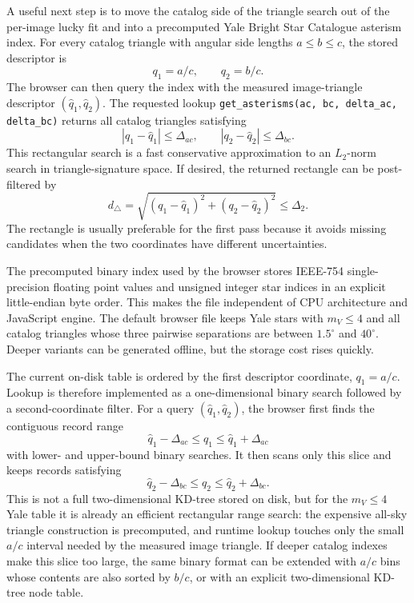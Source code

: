 \documentclass[11pt]{article}
\begin{document}
A useful next step is to move the catalog side of the triangle search out of
the per-image lucky fit and into a precomputed Yale Bright Star Catalogue
asterism index. For every catalog triangle with angular side lengths
\(a\le b\le c\), the stored descriptor is
\begin{equation}
  q_1 = a/c,\qquad q_2 = b/c .
\end{equation}
The browser can then query the index with the measured image-triangle
descriptor \((\hat q_1,\hat q_2)\). The requested lookup
\texttt{get\_asterisms(ac, bc, delta\_ac, delta\_bc)} returns all catalog
triangles satisfying
\begin{equation}
  |q_1-\hat q_1| \le \Delta_{ac}, \qquad
  |q_2-\hat q_2| \le \Delta_{bc}.
\end{equation}
This rectangular search is a fast conservative approximation to an
\(L_2\)-norm search in triangle-signature space. If desired, the returned
rectangle can be post-filtered by
\begin{equation}
  d_\triangle =
  \sqrt{(q_1-\hat q_1)^2 + (q_2-\hat q_2)^2}
  \le \Delta_2 .
\end{equation}
The rectangle is usually preferable for the first pass because it avoids
missing candidates when the two coordinates have different uncertainties.

The precomputed binary index used by the browser stores IEEE-754
single-precision floating point values and unsigned integer star indices in an
explicit little-endian byte order. This makes the file independent of CPU
architecture and JavaScript engine. The default browser file keeps Yale stars
with \(m_V\le4\) and all catalog triangles whose three pairwise separations are
between \(1.5^\circ\) and \(40^\circ\). Deeper variants can be generated
offline, but the storage cost rises quickly.

The current on-disk table is ordered by the first descriptor coordinate,
\(q_1=a/c\). Lookup is therefore implemented as a one-dimensional binary
search followed by a second-coordinate filter. For a query
\((\hat q_1,\hat q_2)\), the browser first finds the contiguous record range
\begin{equation}
  \hat q_1-\Delta_{ac} \le q_1 \le \hat q_1+\Delta_{ac}
\end{equation}
with lower- and upper-bound binary searches. It then scans only this slice and
keeps records satisfying
\begin{equation}
  \hat q_2-\Delta_{bc} \le q_2 \le \hat q_2+\Delta_{bc}.
\end{equation}
This is not a full two-dimensional KD-tree stored on disk, but for the
\(m_V\le4\) Yale table it is already an efficient rectangular range search:
the expensive all-sky triangle construction is precomputed, and runtime lookup
touches only the small \(a/c\) interval needed by the measured image triangle.
If deeper catalog indexes make this slice too large, the same binary format can
be extended with \(a/c\) bins whose contents are also sorted by \(b/c\), or with
an explicit two-dimensional KD-tree node table.
\end{document}
